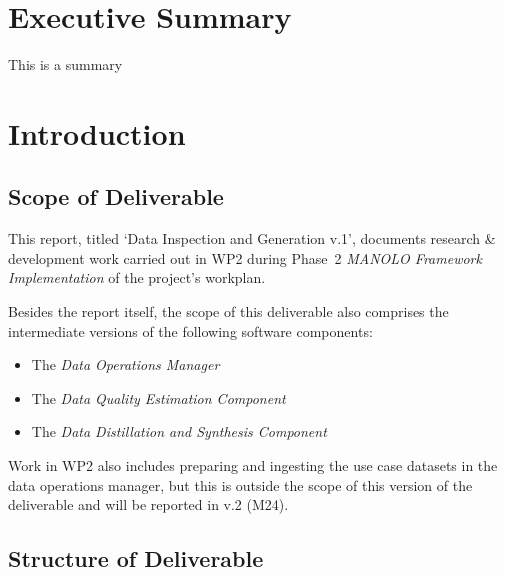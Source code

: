 \documentclass{manolo}
\newcommand{\quotes}[1]{`#1'}
\begin{document}
\section*{Executive Summary}

This is a summary


\clearpage

\section{Introduction}

\subsection{Scope of Deliverable}

This report, titled \quotes{Data Inspection and Generation v.1},
documents research \& development work carried out in WP2 during
Phase~2 \emph{MANOLO Framework Implementation} of the project's
workplan.

Besides the report itself, the scope of this deliverable also comprises
the intermediate versions of the following software components:
%
\begin{itemize}
\item The \emph{Data Operations Manager}
\item The \emph{Data Quality Estimation Component}
\item The \emph{Data Distillation and Synthesis Component}
\end{itemize}

Work in WP2 also includes preparing and ingesting the use case
datasets in the data operations manager, but this is outside the scope
of this version of the deliverable and will be reported in v.2 (M24).

\subsection{Structure of Deliverable}
\end{document}
